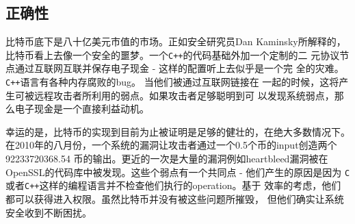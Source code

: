 \documentclass[letterpaper]{article}
\begin{document}
\subsection{正确性}
比特币底下是八十亿美元市值的市场。正如安全研究员Dan Kaminsky所解释的，
比特币看上去像一个安全的噩梦。一个\verb!C++!的代码基础外加一个定制的二
元协议节点通过互联网互联并保存电子现金 - 这样的配置听上去似乎是一个完
全的灾难。\verb!C++!语言有各种内存腐败的bug。 当他们被通过互联网链接在
一起的时候，这将产生可被远程攻击者所利用的弱点。如果攻击者足够聪明到可
以发现系统弱点，那么电子现金是一个直接利益动机。

幸运的是，比特币的实现到目前为止被证明是足够的健壮的，在绝大多数情况下。
在2010年的八月份，一个系统的漏洞让攻击者通过一个0.5个币的input创造两个
92233720368.54 币的输出。更近的一次是大量的漏洞例如heartbleed漏洞被在
OpenSSL的代码库中被发现。这些个弱点有一个共同点 - 他们产生的原因是因为
\verb!C!或者\verb!C++!这样的编程语言并不检查他们执行的operation。基于
效率的考虑，他们都可以获得进入权限。虽然比特币并没有被这些问题所摧毁，
但他们确实让系统安全收到不断困扰。
\end{document}
